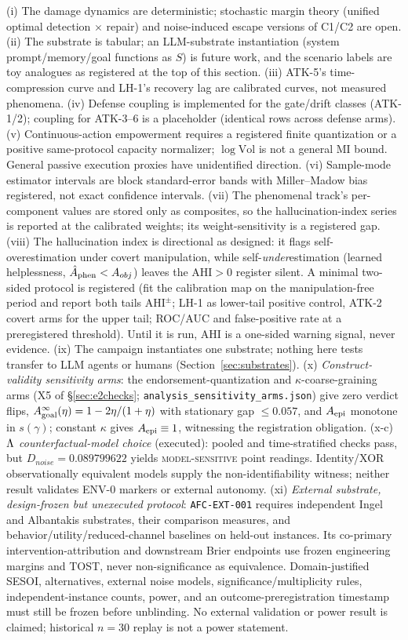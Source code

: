 (i) The damage dynamics are deterministic; stochastic margin theory (unified
optimal detection $\times$ repair) and noise-induced escape versions of C1/C2
are open. (ii) The substrate is tabular; an LLM-substrate instantiation
(system prompt/memory/goal functions as $S$) is future work, and the scenario
labels are toy analogues as registered at the top of this section. (iii)
ATK-5's
time-compression curve and LH-1's recovery lag are calibrated curves, not
measured phenomena. (iv) Defense coupling is implemented for the gate/drift
classes (ATK-1/2);
coupling for ATK-3--6 is a placeholder (identical rows across defense
arms). (v) Continuous-action empowerment requires a registered finite
quantization or a positive same-protocol capacity normalizer;
$\log\mathrm{Vol}$ is not a general MI bound. General passive execution
proxies have unidentified direction.
(vi) Sample-mode estimator intervals are block standard-error bands with
Miller--Madow bias registered, not exact confidence intervals.
(vii) The phenomenal track's per-component values are stored only as
composites, so the hallucination-index series is reported at the calibrated
weights; its weight-sensitivity is a registered gap.
(viii) The hallucination index is directional as designed: it flags
self-overestimation under covert manipulation, while self-\emph{under}estimation
(learned helplessness, $\hat{A}_{\mathrm{phen}}<A_{obj}$) leaves the $\mathrm{AHI}>0$ register
silent. A minimal two-sided protocol is registered (fit the calibration map
on the manipulation-free period and report both tails $\mathrm{AHI}^{\pm}$;
LH-1 as lower-tail positive control, ATK-2 covert arms for the upper tail;
ROC/AUC and false-positive rate at a preregistered threshold). Until it is
run, AHI is a one-sided warning signal, never evidence.
(ix) The campaign instantiates one substrate; nothing here tests transfer to
LLM agents or humans (Section~\ref{sec:substrates}).
(x) \emph{Construct-validity sensitivity arms}: the endorsement-quantization
and $\kappa$-coarse-graining arms (X5 of \S\ref{sec:e2checks};
\texttt{analysis\_sensitivity\_arms.json}) give zero verdict flips,
$A_{\mathrm{goal}}^\infty(\eta)=1-2\eta/(1+\eta)$ with stationary gap $\le0.057$, and
$A_{\mathrm{epi}}$ monotone in $s(\gamma)$; constant $\kappa$ gives $A_{\mathrm{epi}}\equiv1$,
witnessing the registration obligation.
(x-c) \emph{$\Lambda$ counterfactual-model choice} (executed): pooled and
time-stratified checks pass, but $D_{noise}=0.089799622$ yields
\textsc{model-sensitive} point readings. Identity/XOR observationally
equivalent models supply the non-identifiability witness; neither result
validates ENV-0 markers or external autonomy.
(xi) \emph{External substrate, design-frozen but unexecuted protocol}:
\texttt{AFC-EXT-001} requires independent Ingel and Albantakis substrates,
their comparison measures, and behavior/utility/reduced-channel baselines on
held-out instances. Its co-primary intervention-attribution and downstream
Brier endpoints use frozen engineering margins and TOST, never
non-significance as equivalence. Domain-justified SESOI, alternatives, external
noise models, significance/multiplicity rules, independent-instance counts,
power, and an outcome-preregistration timestamp must still be frozen before
unblinding. No external validation or power result is claimed; historical
$n=30$ replay is not a power statement.

